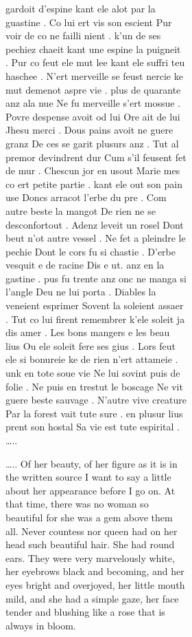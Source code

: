 \documentclass[
  letterpaper,
  DIV=11,
  numbers=noendperiod,
  oneside]{scrreprt}
\begin{document}
\begin{figure}
\begin{figure}
\begin{figure}
\begin{minipage}{0.20\linewidth}
gardoit d'espine kant ele alot par la guastine . Co lui ert vis son
escient Pur voir de co {ne} failli {nient} . k'un de ses pechiez chaeit
kant une espine la puigneit . Pur co feut ele mut lee kant ele suffri
teu haschee . {N'ert merveille} se feust {nercie} ke mut demenot aspre
vie . plus de quarante anz ala nue {Ne fu merveille} s'ert mossue .
Povre despense avoit od lui Ore ait de lui Jhesu merci . Dous pains
avoit {ne guere granz} De ces se garit plusurs anz . Tut al premor
devindrent dur Cum s'il feusent fet de mur . Chescun jor en usout Marie
mes co ert petite partie . kant ele out son pain use Doncs arracot
l'erbe du pre . Com autre beste la mangot {De rien ne} se desconfortout
. Adenz leveit un rosel Dont beut n'ot autre vessel . {Ne} fet a
pleindre le pechie Dont le cors fu si chastie . D'erbe vesquit e de
racine Dis e ut. anz en la gastine . pus fu trente anz {onc ne} manga si
l'angle Deu ne lui porta . Diables la veneient esprimer Sovent la
soleient assaer . Tut co lui firent remembrer k'ele soleit ja dis amer .
Les bons mangers e les beau lius Ou ele soleit fere ses gius . Lors feut
ele si bonureie {ke de {rien n'}ert attameie .} {unk} en tote soue vie
{Ne} lui sovint puis de folie . {Ne} puis en trestut le boscage {Ne} vit
{guere} beste sauvage . {N'}autre vive creature Par la forest vait tute
sure . en plusur lius prent son hostal Sa vie est tute espirital .
\ldots..

\ldots.. Of her beauty, of her figure as it is in the written source I
want to say a little about her appearance before I go on. {At that time,
there was {no} woman so beautiful} {for she was a gem above them all.}
{Never} countess {nor} queen {had} on her head such beautiful hair. She
had round ears. They were very marvelously {white,} her eyebrows {black}
and becoming, and her eyes {bright} and overjoyed, her little mouth
mild, and she had a {simple} gaze, her face tender and {blushing} {like
a rose that is always in bloom.}


\end{minipage}
\end{figure}
\end{figure}
\end{figure}
\end{document}
